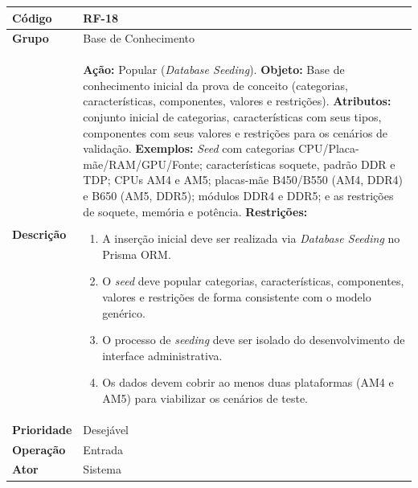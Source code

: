 \FloatBarrier
\begin{quadro}[htb]
  \caption{RF-18 -- Popular base de conhecimento via \textit{Database Seeding}}
  \label{quad:rf18}
  \begin{tabular}{|p{3.2cm}|p{11.8cm}|}
    \hline
    \textbf{Código}     & RF-18                                                                                                                    \\ \hline
    \textbf{Grupo}      & Base de Conhecimento                                                                                                     \\ \hline
    \textbf{Descrição}  &
    \textbf{Ação:} Popular (\textit{Database Seeding}).
    \textbf{Objeto:} Base de conhecimento inicial da prova de conceito (categorias, características, componentes, valores e restrições).
    \textbf{Atributos:} conjunto inicial de categorias, características com seus tipos, componentes com seus valores e restrições para os cenários de validação.
    \textbf{Exemplos:} \textit{Seed} com categorias CPU/Placa-mãe/RAM/GPU/Fonte; características soquete, padrão DDR e TDP; CPUs AM4 e AM5; placas-mãe B450/B550 (AM4, DDR4) e B650 (AM5, DDR5); módulos DDR4 e DDR5; e as restrições de soquete, memória e potência.
    \textbf{Restrições:}
    \begin{enumerate}[nosep,leftmargin=1.2em,topsep=2pt,partopsep=0pt,parsep=0pt,itemsep=1pt]
      \item A inserção inicial deve ser realizada via \textit{Database Seeding} no Prisma ORM.
      \item O \textit{seed} deve popular categorias, características, componentes, valores e restrições de forma consistente com o modelo genérico.
      \item O processo de \textit{seeding} deve ser isolado do desenvolvimento de interface administrativa.
      \item Os dados devem cobrir ao menos duas plataformas (AM4 e AM5) para viabilizar os cenários de teste.
    \end{enumerate} \\ \hline
    \textbf{Prioridade} & Desejável                                                                                                                \\ \hline
    \textbf{Operação}   & Entrada                                                                                                                  \\ \hline
    \textbf{Ator}       & Sistema                                                                                                                  \\ \hline
  \end{tabular}
\end{quadro}

